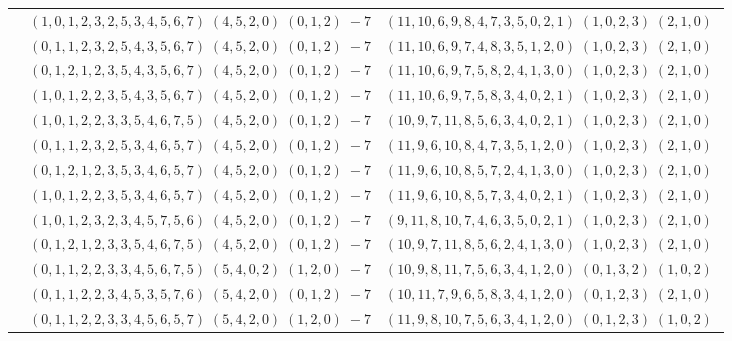\documentclass[11pt]{article}
\begin{document}
\begin{longtable}[l]{|c|c|c|}
 \cline{2-3} 
 & $(1 ,0 ,1 ,2 ,3 ,2 ,5 ,3 ,4 ,5 ,6 ,7) \;(4 ,5 ,2 ,0) \;(0 ,1 ,2) \;-7$ & $(11 ,10 ,6 ,9 ,8 ,4 ,7 ,3 ,5 ,0 ,2 ,1) \;(1 ,0 ,2 ,3) \;(2 ,1 ,0) \;$\\ 
 \cline{2-3} 
 & $(0 ,1 ,1 ,2 ,3 ,2 ,5 ,4 ,3 ,5 ,6 ,7) \;(4 ,5 ,2 ,0) \;(0 ,1 ,2) \;-7$ & $(11 ,10 ,6 ,9 ,7 ,4 ,8 ,3 ,5 ,1 ,2 ,0) \;(1 ,0 ,2 ,3) \;(2 ,1 ,0) \;$\\ 
 \cline{2-3} 
 & $(0 ,1 ,2 ,1 ,2 ,3 ,5 ,4 ,3 ,5 ,6 ,7) \;(4 ,5 ,2 ,0) \;(0 ,1 ,2) \;-7$ & $(11 ,10 ,6 ,9 ,7 ,5 ,8 ,2 ,4 ,1 ,3 ,0) \;(1 ,0 ,2 ,3) \;(2 ,1 ,0) \;$\\ 
 \cline{2-3} 
 & $(1 ,0 ,1 ,2 ,2 ,3 ,5 ,4 ,3 ,5 ,6 ,7) \;(4 ,5 ,2 ,0) \;(0 ,1 ,2) \;-7$ & $(11 ,10 ,6 ,9 ,7 ,5 ,8 ,3 ,4 ,0 ,2 ,1) \;(1 ,0 ,2 ,3) \;(2 ,1 ,0) \;$\\ 
 \cline{2-3} 
 & $(1 ,0 ,1 ,2 ,2 ,3 ,3 ,5 ,4 ,6 ,7 ,5) \;(4 ,5 ,2 ,0) \;(0 ,1 ,2) \;-7$ & $(10 ,9 ,7 ,11 ,8 ,5 ,6 ,3 ,4 ,0 ,2 ,1) \;(1 ,0 ,2 ,3) \;(2 ,1 ,0) \;$\\ 
 \cline{2-3} 
 & $(0 ,1 ,1 ,2 ,3 ,2 ,5 ,3 ,4 ,6 ,5 ,7) \;(4 ,5 ,2 ,0) \;(0 ,1 ,2) \;-7$ & $(11 ,9 ,6 ,10 ,8 ,4 ,7 ,3 ,5 ,1 ,2 ,0) \;(1 ,0 ,2 ,3) \;(2 ,1 ,0) \;$\\ 
 \cline{2-3} 
 & $(0 ,1 ,2 ,1 ,2 ,3 ,5 ,3 ,4 ,6 ,5 ,7) \;(4 ,5 ,2 ,0) \;(0 ,1 ,2) \;-7$ & $(11 ,9 ,6 ,10 ,8 ,5 ,7 ,2 ,4 ,1 ,3 ,0) \;(1 ,0 ,2 ,3) \;(2 ,1 ,0) \;$\\ 
 \cline{2-3} 
 & $(1 ,0 ,1 ,2 ,2 ,3 ,5 ,3 ,4 ,6 ,5 ,7) \;(4 ,5 ,2 ,0) \;(0 ,1 ,2) \;-7$ & $(11 ,9 ,6 ,10 ,8 ,5 ,7 ,3 ,4 ,0 ,2 ,1) \;(1 ,0 ,2 ,3) \;(2 ,1 ,0) \;$\\ 
 \cline{2-3} 
 & $(1 ,0 ,1 ,2 ,3 ,2 ,3 ,4 ,5 ,7 ,5 ,6) \;(4 ,5 ,2 ,0) \;(0 ,1 ,2) \;-7$ & $(9 ,11 ,8 ,10 ,7 ,4 ,6 ,3 ,5 ,0 ,2 ,1) \;(1 ,0 ,2 ,3) \;(2 ,1 ,0) \;$\\ 
 \cline{2-3} 
 & $(0 ,1 ,2 ,1 ,2 ,3 ,3 ,5 ,4 ,6 ,7 ,5) \;(4 ,5 ,2 ,0) \;(0 ,1 ,2) \;-7$ & $(10 ,9 ,7 ,11 ,8 ,5 ,6 ,2 ,4 ,1 ,3 ,0) \;(1 ,0 ,2 ,3) \;(2 ,1 ,0) \;$\\ 
 \cline{2-3} 
 & $(0 ,1 ,1 ,2 ,2 ,3 ,3 ,4 ,5 ,6 ,7 ,5) \;(5 ,4 ,0 ,2) \;(1 ,2 ,0) \;-7$ & $(10 ,9 ,8 ,11 ,7 ,5 ,6 ,3 ,4 ,1 ,2 ,0) \;(0 ,1 ,3 ,2) \;(1 ,0 ,2) \;$\\ 
 \cline{2-3} 
 & $(0 ,1 ,1 ,2 ,2 ,3 ,4 ,5 ,3 ,5 ,7 ,6) \;(5 ,4 ,2 ,0) \;(0 ,1 ,2) \;-7$ & $(10 ,11 ,7 ,9 ,6 ,5 ,8 ,3 ,4 ,1 ,2 ,0) \;(0 ,1 ,2 ,3) \;(2 ,1 ,0) \;$\\ 
 \cline{2-3} 
 & $(0 ,1 ,1 ,2 ,2 ,3 ,3 ,4 ,5 ,6 ,5 ,7) \;(5 ,4 ,2 ,0) \;(1 ,2 ,0) \;-7$ & $(11 ,9 ,8 ,10 ,7 ,5 ,6 ,3 ,4 ,1 ,2 ,0) \;(0 ,1 ,2 ,3) \;(1 ,0 ,2) \;$\\ 

\end{longtable}
\end{document}
